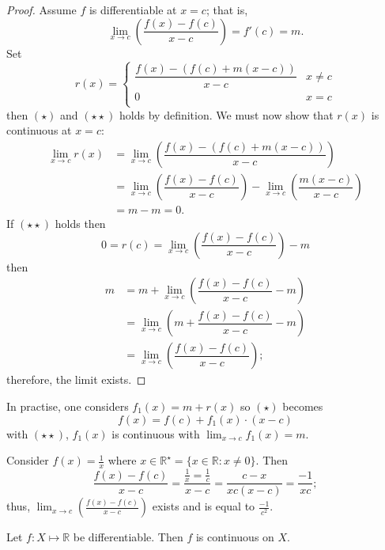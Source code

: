 \begin{proof}
    Assume $f$ is differentiable at $x = c$; that is, \[ \lim_{x \to c} \left( \dfrac{f(x) - f(c)}{x - c} \right) = f'(c) = m. \] Set 
    \[ 
        r(x) =
        \begin{cases}
            \dfrac{f(x) - (f(c) + m(x - c))}{x - c} & x \neq c \\
            0 & x = c \\
        \end{cases}
    \]
    then $(\star)$ and $(\star\star)$ holds by definition. We must now show that $r(x)$ is continuous at $x = c$:
    \begin{align*}
        \lim_{x \to c} r(x) &= \lim_{x \to c} \left( \dfrac{f(x) - (f(c) + m(x - c))}{x - c} \right) \\
        &= \lim_{x \to c} \left( \dfrac{f(x) - f(c)}{x - c} \right) - \lim_{x \to c} \left( \dfrac{m(x - c)}{x - c} \right) \tag{by COLT} \\
        &= m - m = 0.
    \end{align*}
    If $(\star\star)$ holds then \[ 0 = r(c) = \lim_{x \to c} \left( \dfrac{f(x) - f(c)}{x - c} \right) - m \]
    then 
    \begin{align*}
        m &= m + \lim_{x \to c} \left( \dfrac{f(x) - f(c)}{x - c} - m \right) \\
        &= \lim_{x \to c} \left( m + \dfrac{f(x) - f(c)}{x - c} - m \right) \tag{by COLT} \\
        &= \lim_{x \to c} \left( \dfrac{f(x) - f(c)}{x - c} \right);
    \end{align*}
    therefore, the limit exists.
\end{proof}

\begin{remark}
    In practise, one considers $f_1(x) = m + r(x)$ so $(\star)$ becomes \[ f(x) = f(c) + f_1(x) \cdot (x - c) \] with $(\star\star)$, $f_1(x)$ is continuous with $\lim_{x \to c} f_1(x) = m$.
\end{remark}

\begin{example}
    Consider $f(x) = \frac{1}{x}$ where $x \in \mathbb{R}^\star = \{ x \in \mathbb{R} : x \neq 0 \}$. Then \[ \frac{f(x) - f(c)}{x - c} = \frac{\frac{1}{x} = \frac{1}{c}}{x - c} = \frac{c - x}{xc(x - c)} = \frac{-1}{xc}; \] thus, $\lim_{x \to c} \left( \frac{f(x) - f(c)}{x - c} \right)$ exists and is equal to $\frac{-1}{c^2}$.
\end{example}

\begin{theorem}
    Let $f : X \mapsto \mathbb{R}$ be differentiable. Then $f$ is continuous on $X$.
\end{theorem}


